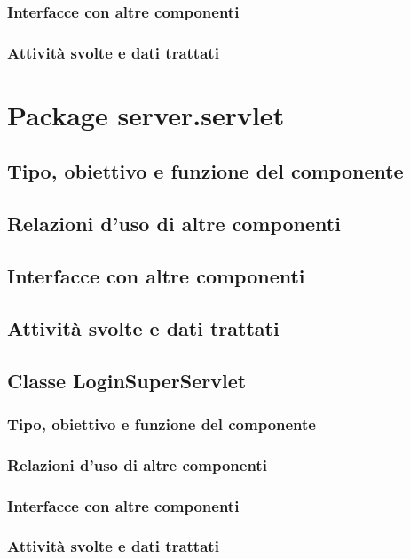 \subsubsection*{Interfacce con altre componenti}
\subsubsection*{Attivit\`a svolte e dati trattati}

\newpage
\section{Package server.servlet} %
\subsection*{Tipo, obiettivo e funzione del componente}
\subsection*{Relazioni d'uso di altre componenti}
\subsection*{Interfacce con altre componenti}
\subsection*{Attivit\`a svolte e dati trattati}

\subsection{Classe LoginSuperServlet}
\subsubsection*{Tipo, obiettivo e funzione del componente}
\subsubsection*{Relazioni d'uso di altre componenti}
\subsubsection*{Interfacce con altre componenti}
\subsubsection*{Attivit\`a svolte e dati trattati}

